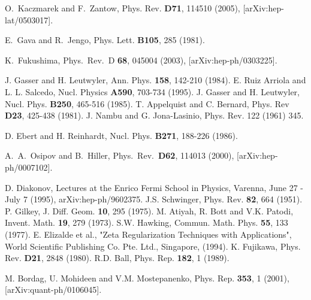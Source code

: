 \begin{thebibliography}{10}
O.~Kaczmarek and F.~Zantow,
\newblock Phys. Rev. {\bf D71}, 114510 (2005), [arXiv:hep-lat/0503017].

E.~Gava and R.~Jengo,
\newblock Phys. Lett. {\bf B105}, 285 (1981).


  K.~Fukushima,
  Phys.\ Rev.\ D {\bf 68}, 045004 (2003),
  [arXiv:hep-ph/0303225].

J. Gasser and H. Leutwyler, Ann. Phys. {\bf 158}, 142-210 (1984).
E. Ruiz Arriola and L. L. Salcedo, Nucl. Physics {\bf A590}, 703-734 (1995).
J. Gasser and H. Leutwyler, Nucl. Phys. {\bf B250}, 465-516 (1985). 
T. Appelquist and C. Bernard, Phys. Rev {\bf D23}, 425-438 (1981).
J. Nambu and G. Jona-Lasinio, Phys. Rev. 122 (1961) 345.

D. Ebert and H. Reinhardt, Nucl. Phys. {\bf B271}, 188-226 (1986).



  A.~A.~Osipov and B.~Hiller,
  Phys.\ Rev.\  {\bf D62}, 114013 (2000),
  [arXiv:hep-ph/0007102].



D. Diakonov, Lectures at the Enrico Fermi School in Physics, Varenna, June 27 - July 7 (1995), arXiv:hep-ph/9602375.
 J.S. Schwinger, Phys. Rev. {\bf 82}, 664 (1951).
P. Gilkey, J. Diff. Geom. {\bf 10}, 295 (1975).
M. Atiyah, R. Bott and V.K. Patodi, Invent. Math. {\bf 19}, 279 (1973).
S.W. Hawking, Commun. Math. Phys. {\bf 55}, 133 (1977). 
E. Elizalde et al., "Zeta Regularization Techniques with Applications", World Scientific Publishing Co. Pte. Ltd., Singapore, (1994).
K. Fujikawa, Phys. Rev. {\bf D21}, 2848 (1980).
R.D. Ball, Phys. Rep. {\bf 182}, 1 (1989).


M. Bordag, U. Mohideen and V.M. Mostepanenko, Phys. Rep. {\bf 353}, 1 (2001), [arXiv:quant-ph/0106045].


\end{thebibliography}
